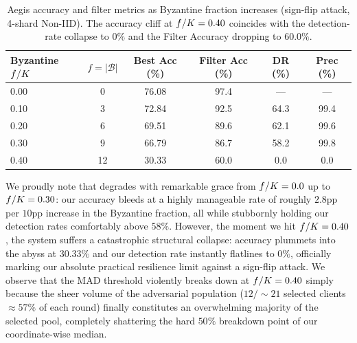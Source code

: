 \documentclass[../main.tex]{subfiles}
\begin{document}
\begin{table}[htbp]
\centering
\caption[\aegis{} accuracy and filter metrics as Byzantine fraction increases]{Aegis accuracy and filter metrics as Byzantine fraction increases (sign-flip attack, 4-shard Non-IID). The accuracy cliff at $f/K=0.40$ coincides with the detection-rate collapse to $0\%$ and the Filter Accuracy dropping to $60.0\%$.}
\label{tab:byz_sweep}
\begin{tabular}{lccccc}
\toprule
\textbf{Byzantine $f/K$} & \textbf{$f = |\mathcal{B}|$} & \textbf{Best Acc (\%)} & \textbf{Filter Acc (\%)} & \textbf{DR (\%)} & \textbf{Prec (\%)} \\
\midrule
0.00 & 0  & 76.08 & 97.4 & ---  & ---  \\
0.10 & 3  & 72.84 & 92.5 & 64.3 & 99.4 \\
0.20 & 6  & 69.51 & 89.6 & 62.1 & 99.6 \\
0.30 & 9  & 66.79 & 86.7 & 58.2 & 99.8 \\
0.40 & 12 & 30.33 & 60.0 &  0.0 &  0.0 \\
\bottomrule
\end{tabular}
\end{table}

We proudly note that \aegis{} degrades with remarkable grace from $f/K=0.0$ up to $f/K=0.30$: our accuracy bleeds at a highly manageable rate of roughly $2.8$pp per $10$pp increase in the Byzantine fraction, all while stubbornly holding our detection rates comfortably above $58\%$. However, the moment we hit $f/K=0.40$, the system suffers a catastrophic structural collapse: accuracy plummets into the abyss at $30.33\%$ and our detection rate instantly flatlines to $0\%$, officially marking our absolute practical resilience limit against a sign-flip attack. We observe that the MAD threshold violently breaks down at $f/K=0.40$ simply because the sheer volume of the adversarial population ($12/\sim21$ selected clients $\approx 57\%$ of each round) finally constitutes an overwhelming majority of the selected pool, completely shattering the hard $50\%$ breakdown point of our coordinate-wise median.
\end{document}
